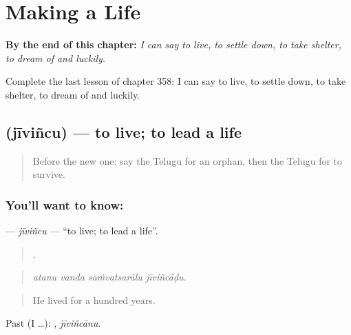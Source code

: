 
\chapter{Making a Life}
\label{ch:te-making-a-life}

\begin{chapteropening}
\textbf{By the end of this chapter:} \emph{I can say to live, to settle down, to take shelter, to dream of and luckily.}

Complete the last lesson of chapter 358: I can say to live, to settle down, to take shelter, to dream of and luckily.
\end{chapteropening}

\section[\texorpdfstring{\te{జీవించు} (jīviñcu)}{జీవించు (jīviñcu)}]{ (jīviñcu) — to live; to lead a life}

\label{lesson:TE-C358-jivincu}



\begin{quote}
Before the new one: say the Telugu for an orphan, then the Telugu for to survive.
\end{quote}

\subsection*{You'll want to know: }
\textbf{} — \emph{jīviñcu} — \textquotedblleft{}to live; to lead a life\textquotedblright{}.

\begin{quote}
   .
\end{quote}

\begin{quote}
\emph{atanu vanda saṁvatsarālu jīviñcāḍu.}
\end{quote}

\begin{quote}
He lived for a hundred years.
\end{quote}

Past (I …): , \emph{jīviñcānu}.

